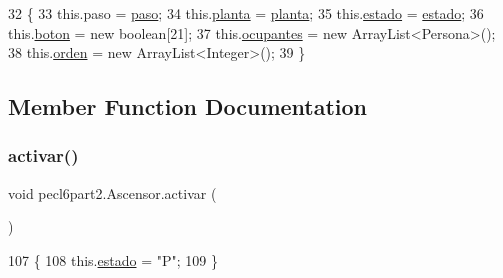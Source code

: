 \begin{DoxyCode}
32     \{
33         this.paso = \mbox{\hyperlink{classpecl6part2_1_1_ascensor_adc56f3cc0cc6adaf409f5aeb4283808f}{paso}};
34         this.\mbox{\hyperlink{classpecl6part2_1_1_ascensor_a66017643cc6554b17d447867a0c0d619}{planta}} = \mbox{\hyperlink{classpecl6part2_1_1_ascensor_a66017643cc6554b17d447867a0c0d619}{planta}};
35         this.\mbox{\hyperlink{classpecl6part2_1_1_ascensor_a6a578a2c1bc59586257fe412a44354ac}{estado}} = \mbox{\hyperlink{classpecl6part2_1_1_ascensor_a6a578a2c1bc59586257fe412a44354ac}{estado}};
36         this.\mbox{\hyperlink{classpecl6part2_1_1_ascensor_a537cb674ee504643dd08130f89e1e068}{boton}} = \textcolor{keyword}{new} \textcolor{keywordtype}{boolean}[21];
37         this.\mbox{\hyperlink{classpecl6part2_1_1_ascensor_af4dd01a24c9588e94061d4e61045563a}{ocupantes}} = \textcolor{keyword}{new} ArrayList<Persona>();
38         this.\mbox{\hyperlink{classpecl6part2_1_1_ascensor_a92a9c3265671bd3d2654626f62094cf9}{orden}} = \textcolor{keyword}{new} ArrayList<Integer>();
39     \}
\end{DoxyCode}


\subsection{Member Function Documentation}
\mbox{\label{classpecl6part2_1_1_ascensor_a50d2b8eb03373f9df861ef78266ac641}} 
\subsubsection{\texorpdfstring{activar()}{activar()}}
{\footnotesize\ttfamily void pecl6part2.\+Ascensor.\+activar (\begin{DoxyParamCaption}{ }\end{DoxyParamCaption})\hspace{0.3cm}{\ttfamily [inline]}}


\begin{DoxyCode}
107     \{
108         this.\mbox{\hyperlink{classpecl6part2_1_1_ascensor_a6a578a2c1bc59586257fe412a44354ac}{estado}} = \textcolor{stringliteral}{"P"};
109     \}
\end{DoxyCode}
\mbox{\label{classpecl6part2_1_1_ascensor_afe4d81d992e11113248e2637e523c28d}} 
